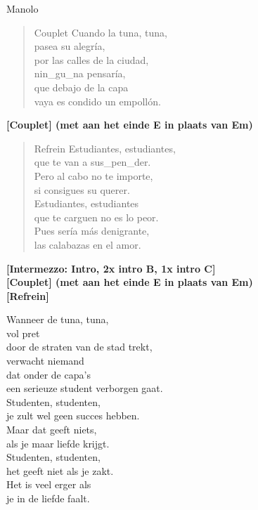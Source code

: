 \begin{song}{Manolo}
\begin{verse}{Couplet}
Cuando la tuna, tuna,\\
pasea su alegría,\\
por las calles de la ciudad,\\
nin\_gu\_na pensaría,\\
que debajo de la capa\\
vaya es condido un empollón.
\end{verse}
\textbf{[Couplet] (met aan het einde E in plaats van Em)}
\begin{verse}{Refrein}
Estudiantes, estudiantes,\\
que te van a sus\_pen\_der.\\
\chord{}Pero al cabo no te importe,\\
si consigues su querer.\\
\vspace{1em}
Estudiantes, estudiantes\\
que te carguen no es lo peor.\\
Pues sería \hspace{0.5em}\hspace{2em} más denigrante,\hspace{1em}\\
las calabazas\hspace{0.5em}\hspace{2em} en el amor.\hspace{1em}\hspace{2em}
\end{verse}
\textbf{[Intermezzo: Intro, 2x intro B, 1x intro C]}\\
\textbf{[Couplet] (met aan het einde E in plaats van Em)}\\
\textbf{[Refrein]}\\
\begin{translation}
Wanneer de tuna, tuna,\\
vol pret\\
door de straten van de stad trekt,\\
verwacht niemand\\
dat onder de capa's\\
een serieuze student verborgen gaat.\\
Studenten, studenten,\\
je zult wel geen succes hebben.\\
Maar dat geeft niets,\\
als je maar liefde krijgt.\\
Studenten, studenten,\\
het geeft niet als je zakt.\\
Het is veel erger als\\
je in de liefde faalt.\\
\end{translation}
\end{song}
